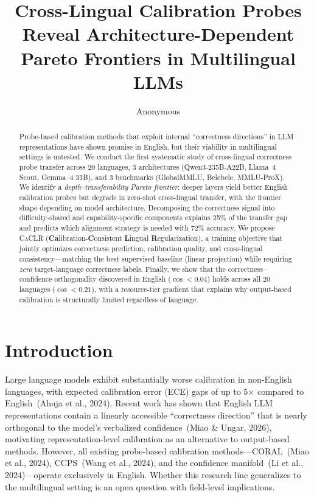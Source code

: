 \documentclass[11pt,a4paper]{article}
\title{Cross-Lingual Calibration Probes Reveal Architecture-Dependent\\Pareto Frontiers in Multilingual LLMs}
\author{Anonymous}
\newcommand{\caclr}{\textsc{CaCLR}}
\begin{document}
\maketitle

\begin{abstract}
Probe-based calibration methods that exploit internal ``correctness directions'' in LLM representations have shown promise in English, but their viability in multilingual settings is untested.
We conduct the first systematic study of cross-lingual correctness probe transfer across 20 languages, 3 architectures (Qwen3-235B-A22B, Llama~4 Scout, Gemma~4 31B), and 3 benchmarks (GlobalMMLU, Belebele, MMLU-ProX).
We identify a \emph{depth--transferability Pareto frontier}: deeper layers yield better English calibration probes but degrade in zero-shot cross-lingual transfer, with the frontier shape depending on model architecture.
Decomposing the correctness signal into difficulty-shared and capability-specific components explains 25\% of the transfer gap and predicts which alignment strategy is needed with 72\% accuracy.
We propose \caclr{} (\textbf{Ca}libration-\textbf{C}onsistent \textbf{L}ingual \textbf{R}egularization), a training objective that jointly optimizes correctness prediction, calibration quality, and cross-lingual consistency---matching the best supervised baseline (linear projection) while requiring \emph{zero} target-language correctness labels.
Finally, we show that the correctness--confidence orthogonality discovered in English ($\cos < 0.04$) holds across all 20 languages ($\cos < 0.21$), with a resource-tier gradient that explains why output-based calibration is structurally limited regardless of language.
\end{abstract}

\section{Introduction}

Large language models exhibit substantially worse calibration in non-English languages, with expected calibration error (ECE) gaps of up to 5$\times$ compared to English~(Ahuja et al., 2024).
Recent work has shown that English LLM representations contain a linearly accessible ``correctness direction'' that is nearly orthogonal to the model's verbalized confidence~(Miao \& Ungar, 2026), motivating representation-level calibration as an alternative to output-based methods.
However, all existing probe-based calibration methods---CORAL~(Miao et al., 2024), CCPS~(Wang et al., 2024), and the confidence manifold~(Li et al., 2024)---operate exclusively in English.
Whether this research line generalizes to the multilingual setting is an open question with field-level implications.
\end{document}
